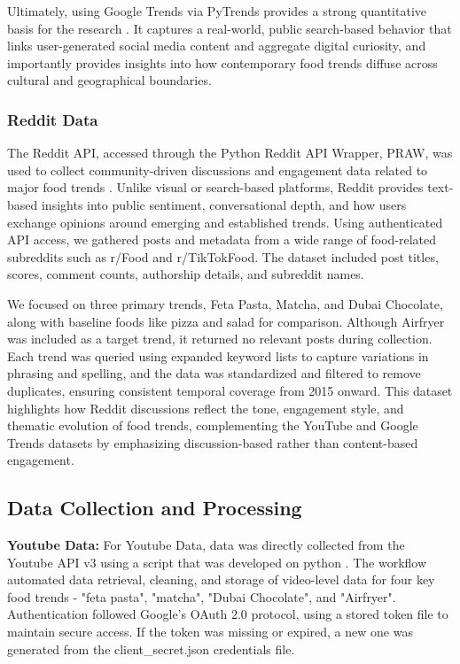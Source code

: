 \documentclass{article}
\begin{document}
Ultimately, using Google Trends via PyTrends provides a strong quantitative basis for the research \citep{pytrends_api}. It captures a real-world, public search-based behavior that links user-generated social media content and aggregate digital curiosity, and importantly provides insights into how contemporary food trends diffuse across cultural and geographical boundaries.

\subsubsection{Reddit Data}
The Reddit API, accessed through the Python Reddit API Wrapper, PRAW, was used to collect community-driven discussions and engagement data related to major food trends \citep{reddit_api_praw}. Unlike visual or search-based platforms, Reddit provides text-based insights into public sentiment, conversational depth, and how users exchange opinions around emerging and established trends. Using authenticated API access, we gathered posts and metadata from a wide range of food-related subreddits such as r/Food and r/TikTokFood. The dataset included post titles, scores, comment counts, authorship details, and subreddit names. 

We focused on three primary trends, Feta Pasta, Matcha, and Dubai Chocolate, along with baseline foods like pizza and salad for comparison. Although Airfryer was included as a target trend, it returned no relevant posts during collection. Each trend was queried using expanded keyword lists to capture variations in phrasing and spelling, and the data was standardized and filtered to remove duplicates, ensuring consistent temporal coverage from 2015 onward. This dataset highlights how Reddit discussions reflect the tone, engagement style, and thematic evolution of food trends, complementing the YouTube and Google Trends datasets by emphasizing discussion-based rather than content-based engagement\citep{reddit_api_praw}.

\subsection{Data Collection and Processing}
\textbf{Youtube Data: }For Youtube Data, data was directly collected from the Youtube API v3 using a script that was developed on python \citep{youtube_api}. The workflow automated data retrieval, cleaning, and storage of video-level data for four key food trends - "feta pasta", "matcha", "Dubai Chocolate", and "Airfryer". Authentication followed Google's OAuth 2.0 protocol, using a stored token file to maintain secure access. If the token was missing or expired, a new one was generated from the client\_secret.json credentials file.
\end{document}
